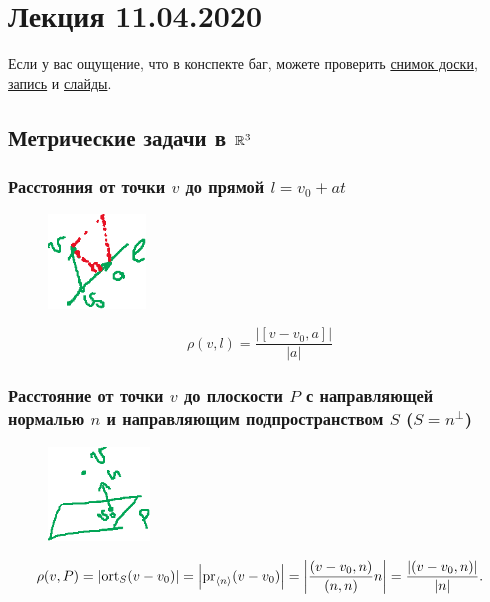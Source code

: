 \section{Лекция 11.04.2020} 

Если у вас ощущение, что в конспекте баг, можете проверить \href{https://www.dropbox.com/s/xsc0pnkmmre2yhe/LA_19-20_osn_Lecture27.svg?dl=0}{снимок доски}, \href{https://youtube.com/watch?v=6WN92vn1HMQ&list=PLEwK9wdS5g0oP4vhnGvQHPSqshML3Ze4P&index=4&t=0s}{запись} и \href{https://www.dropbox.com/s/wnao00nkxnvb9h3/LO_basics.pdf?dl=0}{слайды}.

\subsection{Метрические задачи в $\mathbb{R}^3$}

\subsubsection{Расстояния от точки $v$ до прямой $l = v_0 + at$}

{
\begin{figure}
    \vspace{-40pt}
    \includegraphics[height=2.5cm]{lecture27_drawing_1}
\end{figure}

\begin{equation*}
    \displaystyle
    \rho(v, l) = \frac{\left|[v - v_0, a]\right|}{|a|}
\end{equation*}
}


\subsubsection{Расстояние от точки $v$ до плоскости $P$ с направляющей нормалью $n$ и направляющим подпространством $S$ ($S = n^{\perp}$)}

{
\begin{figure}
    \vspace{-20pt}
    \includegraphics[height=2.5cm]{lecture27_drawing_2}
\end{figure}

\begin{equation*}
    \displaystyle
    \rho(v, P) = \left|\operatorname{\mathop{\mathrm{ort}}}_S (v - v_0)\right| = \left|\operatorname{\mathop{\mathrm{pr}}}_{\left< n \right>} (v - v_0)\right| = \left|\frac{(v - v_0, n)}{(n, n)} n\right| = \frac{|(v - v_0, n)|}{|n|}.
\end{equation*}
\vspace{1cm}
}


